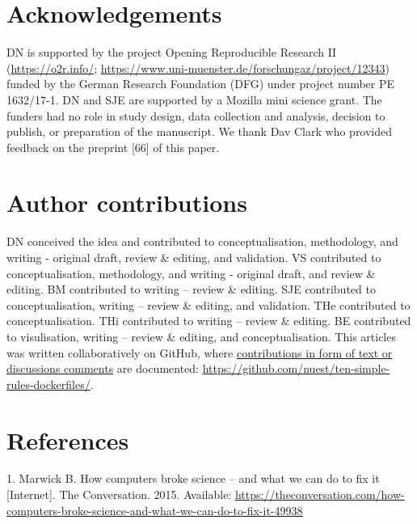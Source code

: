 \documentclass[10pt,letterpaper]{article}
\begin{document}
\hypertarget{acknowledgements}{%
\section*{Acknowledgements}\label{acknowledgements}}

DN is supported by the project Opening Reproducible Research II
(\href{https://o2r.info/}{https://o2r.info/};
\href{https://www.uni-muenster.de/forschungaz/project/12343}{https://www.uni-muenster.de/forschungaz/project/12343})
funded by the German Research Foundation (DFG) under project number PE
1632/17-1. DN and SJE are supported by a Mozilla mini science grant. The
funders had no role in study design, data collection and analysis,
decision to publish, or preparation of the manuscript. We thank Dav
Clark who provided feedback on the preprint {[}66{]} of this paper.

\hypertarget{contributions}{%
\section*{Author contributions}\label{contributions}}

DN conceived the idea and contributed to conceptualisation, methodology,
and writing - original draft, review \& editing, and validation. VS
contributed to conceptualisation, methodology, and writing - original
draft, and review \& editing. BM contributed to writing -- review \&
editing. SJE contributed to conceptualisation, writing -- review \&
editing, and validation. THe contributed to conceptualisation. THi
contributed to writing -- review \& editing. BE contributed to
visulisation, writing -- review \& editing, and conceptualisation. This
articles was written collaboratively on GitHub, where
\href{https://github.com/nuest/ten-simple-rules-dockerfiles/graphs/contributors}{contributions
in form of text or discussions comments} are documented:
\url{https://github.com/nuest/ten-simple-rules-dockerfiles/}.

\hypertarget{references}{%
\section*{References}\label{references}}

\hypertarget{refs}{}
\leavevmode\hypertarget{ref-marwick_how_2015}{}%
1. Marwick B. How computers broke science -- and what we can do to fix
it {[}Internet{]}. The Conversation. 2015. Available:
\url{https://theconversation.com/how-computers-broke-science-and-what-we-can-do-to-fix-it-49938}
\end{document}
